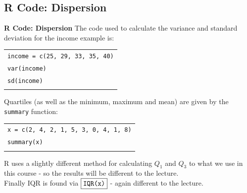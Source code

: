 \documentclass[compress]{beamer}        %
\makeatletter
\newcommand{\tcb}{\textcolor{beamer@blendedblue}}
\makeatother
\begin{document}
\subsection{R Code: Dispersion}
\begin{frame}{\bf \tcb{R Code: Dispersion}}
The code used to calculate the variance and standard deviation for the income example is:\\[0.1cm]
\begin{tabular}{|l|}
\hline
\texttt{income = c(25, 29, 33, 35, 40)}\\
\texttt{var(income)}\\
\texttt{sd(income)}\\
\hline
\multicolumn{1}{c}{}\\[0.1cm]
\end{tabular}

Quartiles (as well as the minimum, maximum and mean) are given by the \texttt{summary} function:\\[0.1cm]
\begin{tabular}{|l|}
\hline
\texttt{x = c(2, 4, 2, 1, 5, 3, 0, 4, 1, 8)}\\
\texttt{summary(x)}\\
\hline
\multicolumn{1}{c}{}\\[-0.1cm]
\end{tabular}

R uses a slightly different method for calculating $Q_1$ and $Q_3$ to what we use in this course - so the results will be different to the lecture.\\[0.4cm]

Finally IQR is found via $\boxed{\text{\texttt{IQR(x)}}}$ - again different to the lecture.
\end{frame}
\end{document}
